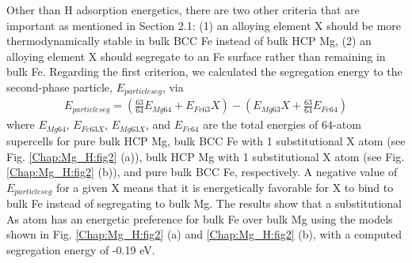 Other than H adsorption energetics, there are two other criteria that are important as mentioned in Section 2.1: (1) an alloying element X should be more thermodynamically stable in bulk \ac{BCC} Fe instead of bulk \ac{HCP} Mg, (2) an alloying element X should segregate to an Fe surface rather than remaining in bulk Fe. Regarding the first criterion, we calculated the segregation energy to the second-phase particle, $E_{particle seg}$, via
\begin{align}
 E_{particle seg} = (\frac{63}{64}E_{Mg64} + E_{Fe63}X) - (E_{Mg63}X + \frac{63}{64}E_{Fe64})
 \label{Chap:Mg_H:eq:particle_seg}
\end{align}
where $E_{Mg64}$, $E_{Fe63X}$, $E_{Mg63X}$, and $E_{Fe64}$ are the total energies of 64-atom supercells for pure bulk HCP Mg, bulk \ac{BCC} Fe with 1 substitutional X atom (see Fig. \ref{Chap:Mg_H:fig2} (a)), bulk HCP Mg with 1 substitutional X atom (see Fig. \ref{Chap:Mg_H:fig2} (b)), and pure bulk \ac{BCC} Fe, respectively. A negative value of $E_{particle seg}$ for a given X means that it is energetically favorable for X to bind to bulk Fe instead of segregating to bulk Mg. The results show that a substitutional As atom has an energetic preference for bulk Fe over bulk Mg using the models shown in Fig. \ref{Chap:Mg_H:fig2} (a) and \ref{Chap:Mg_H:fig2} (b), with a computed segregation energy of -0.19 eV.

